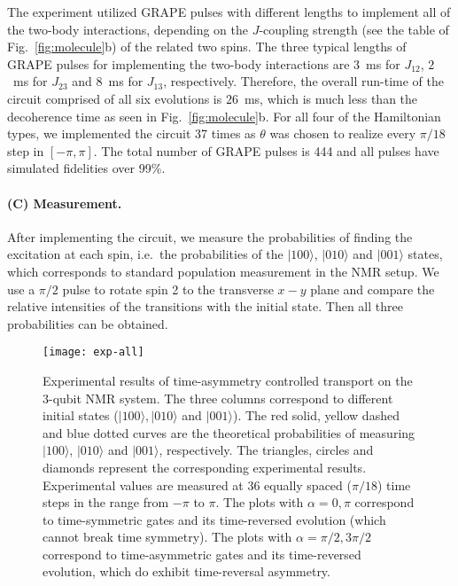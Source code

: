 \documentclass[aps,prx,10pt,
               superscriptaddress,
               twocolumn,
               longbibliography,
showpacs]{revtex4-1}
\theoremstyle{plain}
\theoremstyle{definition}
\newcommand{\ket}[1]{\ensuremath{|#1\rangle}}
\begin{document}

The experiment utilized GRAPE pulses with different lengths
to implement all of the two-body interactions, depending on the $J$-coupling
strength (see the table of Fig.~\ref{fig:molecule}b) of the related two spins. The
three typical lengths of GRAPE pulses for implementing the two-body interactions
are $3$~ms for $J_{12}$, $2$~ms for $J_{23}$ and $8$~ms for $J_{13}$, respectively.
Therefore, the overall run-time of the circuit comprised of all six evolutions is $26$~ms,
which is much less than the decoherence time as seen in
Fig.~\ref{fig:molecule}b. For all four of the Hamiltonian types,
we implemented the circuit 37  times as $\theta$ was chosen to realize
every $\pi/18$ step in $[-\pi, \pi]$. The total number of GRAPE pulses
is 444 and all pulses have simulated fidelities over 99\%.

\paragraph*{(C) Measurement.}
After implementing the circuit, we measure the
probabilities of finding the excitation at each spin, i.e.~the probabilities
of the $\ket{100}$, $\ket{010}$ and $\ket{001}$ states, which
corresponds to standard population measurement in the NMR setup. We use a
$\pi/2$ pulse to rotate spin 2 to the transverse $x-y$ plane and compare the
relative intensities of the transitions with the initial state. Then all three
probabilities can be obtained.



\begin{figure*}
  \centering
  \texttt{[image: exp-all]}
  \caption{%
    Experimental results of time-asymmetry controlled transport on the 3-qubit
NMR system.
The three columns correspond to different initial states
($\ket{100}, \ket{010}$ and $\ket{001}$).
The red solid, yellow dashed and blue dotted curves are the
theoretical probabilities of measuring $\ket{100}$, $\ket{010}$ and $\ket{001}$,
respectively.
The triangles, circles and diamonds represent the corresponding experimental results.
Experimental values are measured at 36 equally spaced ($\pi/18$) time steps
in the range from $-\pi$ to $\pi$.
The plots with $\alpha=0,\pi$ correspond to time-symmetric
gates and its time-reversed evolution (which cannot break time
symmetry). The plots with $\alpha=\pi/2,3\pi/2$ correspond to
time-asymmetric gates and its time-reversed evolution,
which do exhibit time-reversal asymmetry.
}\label{fig:exp}
\end{figure*}
\end{document}
